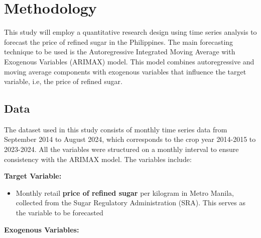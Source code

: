 \documentclass[11pt]{article}
\begin{document}
\section{Methodology}
This study will employ a quantitative research design using time series analysis to forecast the price of refined sugar in the Philippines. The main forecasting technique to be used is the Autoregressive Integrated Moving Average with Exogenous Variables (ARIMAX) model. This model combines autoregressive and moving average components with exogenous variables that influence the target variable, i.e, the price of refined sugar.  

\subsection{Data}
The dataset used in this study consists of monthly time series data from September 2014 to August 2024, which corresponds to the crop year 2014-2015 to 2023-2024. All the variables were structured on a monthly interval to ensure consistency with the ARIMAX model. The variables include:

\textbf{Target Variable:}

\begin{itemize}
    \item Monthly retail \textbf{price of refined sugar} per kilogram in Metro Manila, collected from the Sugar Regulatory Administration (SRA). This serves as the variable to be forecasted
\end{itemize}
    
\textbf{Exogenous Variables:}
\end{document}
